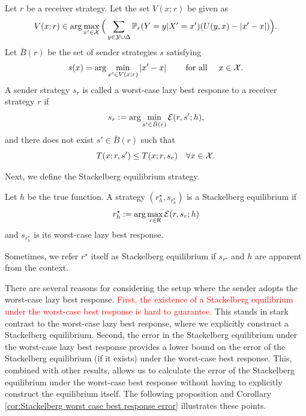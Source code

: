 \begin{defn}\label{def:Lazy_best_response}
Let $r$ be a receiver strategy. Let the set $V(x; r)$ be given as
	\[
	V(x; r) \in \arg\max_{x' \in \mathcal{X}}\Big(\sum_{y \in \mathcal{Y} \cup \Delta} \mathbb{P}_r(Y=y|X'=x')(U(y,x)-|x'-x|)\Big).
	\]
	Let $\bar{B}(r)$ be the set of sender strategies $s$ satisfying
	\begin{equation}
	\begin{aligned}
		s(x) = \arg\min_{x' \in V(x; r)} |x'-x| \quad \text{ for all } x \in \cg{X}.
	\end{aligned}
	\end{equation}
	A sender strategy $s_r$ is called a worst-case lazy best response to a receiver strategy $r$ if
	\begin{equation*}
		s_r := \arg\min_{s' \in \bar{B}(r)} \mathcal{E}(r, s'; h),
	\end{equation*}
	and there does not exist $s' \in \bar{B}(r)$ such that
	\[
	T(x; r, s') \leq T(x; r, s_r) \quad \forall x \in \cg{X}.
	\]
\end{defn}
Next, we define the Stackelberg equilibrium strategy.
\begin{defn}
	Let $h$ be the true function. A strategy $(r^\star_h,s_{r^\star_h})$ is  a Stackelberg equilibrium if
	\[r^\star_{h} := \arg\max_{r \in \mathsf{R}}\mathcal{E}(r, s_r; h)\] and
    $s_{r^\star_h}$ is its worst-case lazy best response.
\end{defn}
\begin{notn}
    Sometimes, we refer $r^\star$ itself as Stackelberg equilibrium if $s_{r^\star}$ and $h$ are apparent from the context.
\end{notn}

There are several reasons for considering the setup where the sender adopts the worst-case lazy best response. \textcolor{red}{First, the existence of a Stackelberg equilibrium under the worst-case best response is hard to guarantee.} This stands in stark contrast to the worst-case lazy best response, where we explicitly construct a Stackelberg equilibrium. Second, the error in the Stackelberg equilibrium under the worst-case lazy best response provides a lower bound on the error of the Stackelberg equilibrium (if it exists) under the worst-case best response. This, combined with other results, allows us to calculate the error of the Stackelberg equilibrium under the worst-case best response without having to explicitly construct the equilibrium itself.
The following proposition and Corollary \ref{cor:Stackelberg worst case best response error} illustrates these points.


